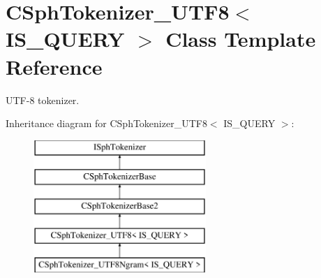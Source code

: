 \hypertarget{classCSphTokenizer__UTF8}{\section{C\-Sph\-Tokenizer\-\_\-\-U\-T\-F8$<$ I\-S\-\_\-\-Q\-U\-E\-R\-Y $>$ Class Template Reference}
\label{classCSphTokenizer__UTF8}
}


U\-T\-F-\/8 tokenizer.  


Inheritance diagram for C\-Sph\-Tokenizer\-\_\-\-U\-T\-F8$<$ I\-S\-\_\-\-Q\-U\-E\-R\-Y $>$\-:\begin{figure}[H]
\begin{center}
\leavevmode
\includegraphics[height=5.000000cm]{classCSphTokenizer__UTF8}
\end{center}
\end{figure}
